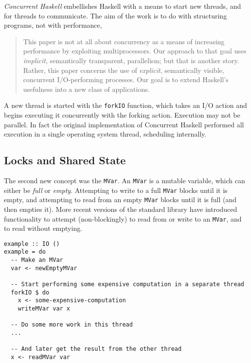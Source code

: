 \textit{Concurrent Haskell}\cite{concurrent} embellishes Haskell with
a means to start new threads, and for threads to communicate. The aim
of the work is to do with structuring programs, not with performance,

\begin{quote}
  This paper is not at all about concurrency as a means of increasing
  performance by exploiting multiprocessors. Our approach to that goal
  uses \textit{implicit}, semantically transparent, parallelism; but
  that is another story. Rather, this paper concerns the use of
  \textit{explicit}, semantically visible, concurrent I/O-performing
  processes. Our goal is to extend Haskell's usefulness into a new
  class of applications.\cite{concurrent}
\end{quote}

A new thread is started with the \verb|forkIO| function, which takes
an I/O action and begins executing it concurrently with the forking
action. Execution may not be parallel. In fact the original
implementation of Concurrent Haskell performed all execution in a
single operating system thread, scheduling internally.

\subsection{Locks and Shared State}
\label{sec:litrev-conc-locks}

The second new concept was the \verb|MVar|. An \verb|MVar| is a
mutable variable, which can either be \textit{full} or
\textit{empty}. Attempting to write to a full \verb|MVar| blocks until
it is empty, and attempting to read from an empty \verb|MVar| blocks
until it is full (and then empties it). More recent versions of the
standard library have introduced functionality to attempt
(non-blockingly) to read from or write to an \verb|MVar|, and to read
without emptying.

\begin{verbatim}
example :: IO ()
example = do
  -- Make an MVar
  var <- newEmptyMVar

  -- Start performing some expensive computation in a separate thread
  forkIO $ do
    x <- some-expensive-computation
    writeMVar var x

  -- Do some more work in this thread
  ...

  -- And later get the result from the other thread
  x <- readMVar var
\end{verbatim}


